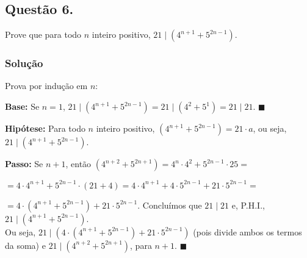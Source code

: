 \documentclass[12pt, letterpaper]{report}
\newcommand*{\CQD}{\hfill\ensuremath{\blacksquare}}%
\newcounter{ProblemNum}
\newcommand*{\anyproblem}[1]{\newpage\subsection*{#1}}
\newcommand*{\problem}[1]{\stepcounter{ProblemNum} %
   \anyproblem{Questão #1}}
\newcommand*{\soln}[1]{\subsubsection*{#1}}
\newcommand*{\solution}{\soln{Solução}}
\begin{document}
\problem{6.}
  Prove que para todo $ n $ inteiro positivo, $ 21 \mid (4^{n + 1} + 5^{2n - 1} )$.

\solution
    Prova por indução em $n$:

    \textbf{Base:} Se $n = 1$, $ 21 \mid (4^{n + 1} + 5^{2n - 1} ) = 21 \mid (4^{2} + 5^{1}) = 21 \mid 21$. \CQD

    \textbf{Hipótese:} Para todo $n$ inteiro positivo, $(4^{n + 1} + 5^{2n - 1} ) = 21 \cdot a$, ou seja, $ 21 \mid (4^{n + 1} + 5^{2n - 1} )$.

    \textbf{Passo:} Se $n + 1$, então $(4^{n + 2} + 5^{2n + 1}) = 4^{n} \cdot 4^2 + 5^{2n - 1} \cdot 25 =$

    $= 4 \cdot 4^{n + 1} + 5^{2n - 1} \cdot (21 + 4) = 4 \cdot 4^{n + 1} + 4 \cdot 5^{2n - 1} + 21 \cdot 5^{2n - 1} =$

    $= 4 \cdot (4^{n + 1} + 5^{2n - 1}) + 21 \cdot 5^{2n - 1}$. Concluímos que $21 \mid 21$ e, P.H.I., $21 \mid (4^{n + 1} + 5^{2n - 1} )$. \\

    Ou seja, $21 \mid (4 \cdot (4^{n + 1} + 5^{2n - 1}) + 21 \cdot 5^{2n - 1})$ (pois divide ambos os termos da soma) e $21 \mid (4^{n + 2} + 5^{2n + 1} )$, para $n + 1$. \CQD
\end{document}
